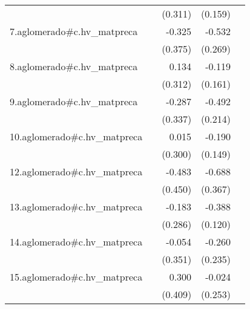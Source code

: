 {\begin{longtable}{l*{4}{D{.}{.}{-1}}}
            &                     &     (0.311)         &     (0.159)         &                     \\
\addlinespace
7.aglomerado#c.hv\_matpreca&                     &      -0.325         &      -0.532\sym{*}  &                     \\
            &                     &     (0.375)         &     (0.269)         &                     \\
\addlinespace
8.aglomerado#c.hv\_matpreca&                     &       0.134         &      -0.119         &                     \\
            &                     &     (0.312)         &     (0.161)         &                     \\
\addlinespace
9.aglomerado#c.hv\_matpreca&                     &      -0.287         &      -0.492\sym{*}  &                     \\
            &                     &     (0.337)         &     (0.214)         &                     \\
\addlinespace
10.aglomerado#c.hv\_matpreca&                     &       0.015         &      -0.190         &                     \\
            &                     &     (0.300)         &     (0.149)         &                     \\
\addlinespace
12.aglomerado#c.hv\_matpreca&                     &      -0.483         &      -0.688         &                     \\
            &                     &     (0.450)         &     (0.367)         &                     \\
\addlinespace
13.aglomerado#c.hv\_matpreca&                     &      -0.183         &      -0.388\sym{**} &                     \\
            &                     &     (0.286)         &     (0.120)         &                     \\
\addlinespace
14.aglomerado#c.hv\_matpreca&                     &      -0.054         &      -0.260         &                     \\
            &                     &     (0.351)         &     (0.235)         &                     \\
\addlinespace
15.aglomerado#c.hv\_matpreca&                     &       0.300         &      -0.024         &                     \\
            &                     &     (0.409)         &     (0.253)         &                     \\

\end{longtable}}
